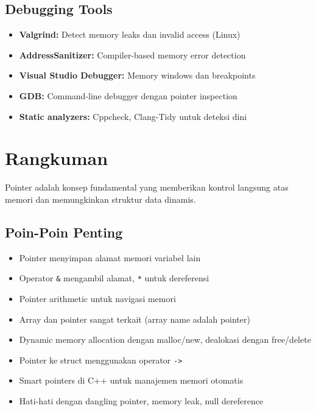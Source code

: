 \documentclass[../main.tex]{subfiles}
\begin{document}
\subsection{Debugging Tools}

\begin{itemize}
  \item \textbf{Valgrind:} Detect memory leaks dan invalid access (Linux) \parencite{valgrind}
  \item \textbf{AddressSanitizer:} Compiler-based memory error detection \parencite{addresssanitizer}
  \item \textbf{Visual Studio Debugger:} Memory windows dan breakpoints
  \item \textbf{GDB:} Command-line debugger dengan pointer inspection
  \item \textbf{Static analyzers:} Cppcheck, Clang-Tidy untuk deteksi dini
\end{itemize}

\section{Rangkuman}

Pointer adalah konsep fundamental yang memberikan kontrol langsung atas memori dan memungkinkan struktur data dinamis.

\subsection{Poin-Poin Penting}

\begin{itemize}
  \item Pointer menyimpan alamat memori variabel lain
  \item Operator \texttt{\&} mengambil alamat, \texttt{*} untuk dereferensi
  \item Pointer arithmetic untuk navigasi memori
  \item Array dan pointer sangat terkait (array name adalah pointer)
  \item Dynamic memory allocation dengan malloc/new, dealokasi dengan free/delete
  \item Pointer ke struct menggunakan operator \texttt{->}
  \item Smart pointers di C++ untuk manajemen memori otomatis
  \item Hati-hati dengan dangling pointer, memory leak, null dereference
\end{itemize}
\end{document}
